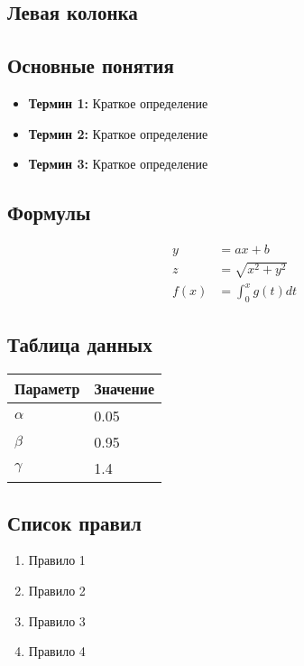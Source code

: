 \documentclass[10pt,landscape,a4paper]{article}
\begin{document}
\begin{multicols}{2}

\section{Левая колонка}

\subsection{Основные понятия}
\begin{itemize}
    \item \textbf{Термин 1:} Краткое определение
    \item \textbf{Термин 2:} Краткое определение
    \item \textbf{Термин 3:} Краткое определение
\end{itemize}

\subsection{Формулы}
\begin{align}
    y &= ax + b \\
    z &= \sqrt{x^2 + y^2} \\
    f(x) &= \int_0^x g(t) dt
\end{align}

\subsection{Таблица данных}
\begin{center}
\small
\begin{tabular}{@{}ll@{}}
\toprule
Параметр & Значение \\
\midrule
$\alpha$ & 0.05 \\
$\beta$ & 0.95 \\
$\gamma$ & 1.4 \\
\bottomrule
\end{tabular}
\end{center}

\subsection{Список правил}
\begin{enumerate}
    \item Правило 1
    \item Правило 2
    \item Правило 3
    \item Правило 4
\end{enumerate}


\end{multicols}
\end{document}
